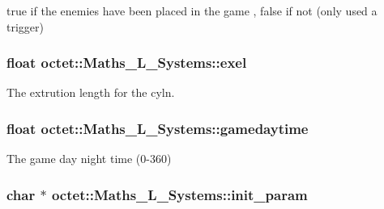 true if the enemies have been placed in the game , false if not (only used a trigger) 

\hypertarget{classoctet_1_1_maths___l___systems_a44da9fdd3c673cac831cf894aa02ec46}{
\subsubsection[{exel}]{\setlength{\rightskip}{0pt plus 5cm}float octet\+::\+Maths\+\_\+\+L\+\_\+\+Systems\+::exel\hspace{0.3cm}{\ttfamily [private]}}}\label{classoctet_1_1_maths___l___systems_a44da9fdd3c673cac831cf894aa02ec46}


The extrution length for the cyln. 

\hypertarget{classoctet_1_1_maths___l___systems_a6afebf4038c4d8b798e7e35d2b0a9652}{
\subsubsection[{gamedaytime}]{\setlength{\rightskip}{0pt plus 5cm}float octet\+::\+Maths\+\_\+\+L\+\_\+\+Systems\+::gamedaytime\hspace{0.3cm}{\ttfamily [private]}}}\label{classoctet_1_1_maths___l___systems_a6afebf4038c4d8b798e7e35d2b0a9652}


The game day night time (0-\/360) 

\hypertarget{classoctet_1_1_maths___l___systems_aec92a84b2e6a408ffe7bdf34ce3285e4}{
\subsubsection[{init\+\_\+param}]{\setlength{\rightskip}{0pt plus 5cm}char $\ast$ octet\+::\+Maths\+\_\+\+L\+\_\+\+Systems\+::init\+\_\+param\hspace{0.3cm}{\ttfamily [private]}}}\label{classoctet_1_1_maths___l___systems_aec92a84b2e6a408ffe7bdf34ce3285e4}


